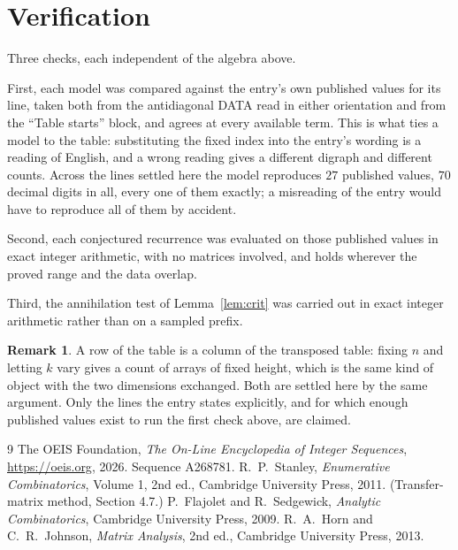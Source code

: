 \documentclass[11pt,a4paper]{article}
\theoremstyle{plain}
\theoremstyle{definition}
\newtheorem{remark}[theorem]{Remark}
\begin{document}
\section{Verification}

Three checks, each independent of the algebra above.

First, each model was compared against the entry's own published values for its line, taken
both from the antidiagonal DATA read in either orientation and from the ``Table starts''
block, and agrees at every available term. This is what ties a model to the table:
substituting the fixed index into the entry's wording is a reading of English, and a wrong
reading gives a different digraph and different counts. Across the lines settled here the
model reproduces $27$ published values, $70$ decimal digits in all, every one of
them exactly; a misreading of the entry would have to reproduce all of them by accident.

Second, each conjectured recurrence was evaluated on those published values in exact
integer arithmetic, with no matrices involved, and holds wherever the proved range and the
data overlap.

Third, the annihilation test of Lemma~\ref{lem:crit} was carried out in exact integer
arithmetic rather than on a sampled prefix.

\begin{remark}
A row of the table is a column of the transposed table: fixing $n$ and letting $k$ vary gives a
count of arrays of fixed height, which is the same kind of object with the two dimensions
exchanged. Both are settled here by the same argument. Only the lines the entry states
explicitly, and for which enough published values exist to run the first check above, are
claimed.
\end{remark}

\begin{thebibliography}{9}
 The OEIS Foundation, \emph{The On-Line Encyclopedia of Integer
Sequences}, \url{https://oeis.org}, 2026. Sequence A268781.
 R.~P.~Stanley, \emph{Enumerative Combinatorics}, Volume 1, 2nd ed.,
Cambridge University Press, 2011. (Transfer-matrix method, Section 4.7.)
 P.~Flajolet and R.~Sedgewick, \emph{Analytic Combinatorics}, Cambridge
University Press, 2009.
 R.~A.~Horn and C.~R.~Johnson, \emph{Matrix Analysis}, 2nd ed., Cambridge
University Press, 2013.
\end{thebibliography}
\end{document}
